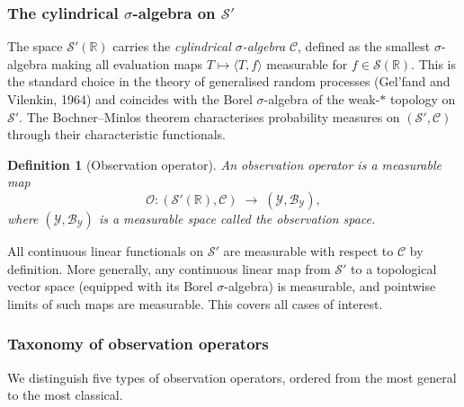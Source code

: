 \documentclass[11pt,a4paper]{article}
\newtheorem{definition}[theorem]{Definition}
\newcommand{\R}{\mathbb{R}}
\begin{document}
\subsubsection*{The cylindrical $\sigma$-algebra on $\mathcal S'$}

The space $\mathcal S'(\R)$ carries the \emph{cylindrical $\sigma$-algebra}
$\mathcal C$, defined as the smallest $\sigma$-algebra making all
evaluation maps $T \mapsto \langle T, f \rangle$ measurable for
$f \in \mathcal S(\R)$.  This is the standard choice in the theory of
generalised random processes (Gel'fand and Vilenkin, 1964) and coincides
with the Borel $\sigma$-algebra of the weak-$*$ topology on $\mathcal S'$.
The Bochner--Minlos theorem characterises probability measures on
$(\mathcal S', \mathcal C)$ through their characteristic functionals.

\begin{definition}[Observation operator]\label{def:obs-operator}
An \emph{observation operator} is a measurable map
\[
\mathcal O : (\mathcal S'(\R), \mathcal C)
\;\longrightarrow\;
(\mathcal Y, \mathcal B_{\mathcal Y}),
\]
where $(\mathcal Y, \mathcal B_{\mathcal Y})$ is a measurable space called
the \emph{observation space}.
\end{definition}

All continuous linear functionals on $\mathcal S'$ are measurable with
respect to $\mathcal C$ by definition.  More generally, any continuous
linear map from $\mathcal S'$ to a topological vector space (equipped with
its Borel $\sigma$-algebra) is measurable, and pointwise limits of such
maps are measurable.  This covers all cases of interest.

\subsubsection*{Taxonomy of observation operators}

We distinguish five types of observation operators, ordered from the most
general to the most classical.
\end{document}
